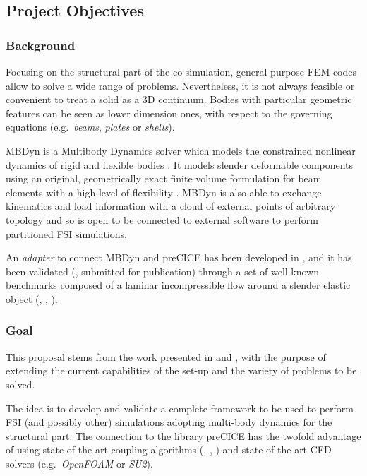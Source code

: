 \subsection*{Project Objectives}


\subsubsection*{Background}

Focusing on the structural part of the co-simulation, general purpose FEM codes allow to solve a wide range of problems. Nevertheless, it is not always feasible or convenient to treat a solid as a 3D continuum. Bodies with particular geometric features can be seen as lower dimension ones, with respect to the governing equations \cite{hjelmstad2007fundamentals} (e.g.\ \textit{beams}, \textit{plates} or \textit{shells}).

MBDyn is a Multibody Dynamics solver which models the constrained nonlinear dynamics of rigid and flexible bodies \cite{masarati2014efficient}. It models slender deformable components using an original, geometrically exact finite volume formulation for beam elements with a high level of flexibility \cite{ghiringhelli2000multibody,bauchau2016validation}. MBDyn is also able to exchange kinematics and load information with a cloud of external points of arbitrary topology \cite{quaranta2005conservative} and so is open to be connected to external software to perform partitioned FSI simulations.

An \textit{adapter} to connect MBDyn and preCICE has been developed in \cite{caccia2020master}, and it has been validated (\cite{caccia2021coupling}, submitted for publication) through a set of well-known benchmarks composed of a laminar incompressible flow around a slender elastic object (\cite{ramm1998fluid}, \cite{turek2006proposal}, \cite{turek2010numerical}).

\subsubsection*{Goal}

This proposal stems from the work presented in \cite{caccia2020master} and \cite{caccia2021coupling}, with the purpose of extending the current capabilities of the set-up and the variety of problems to be solved.

The idea is to develop and validate a complete framework to be used to perform FSI (and possibly other) simulations adopting multi-body dynamics for the structural part. The connection to the library preCICE has the twofold advantage of using state of the art coupling algorithms (\cite{mehl2016parallel}, \cite{bungartz2016precice}, \cite{degroote2009performance}) and state of the art CFD solvers \cite{uekermann2017official} (e.g.\ \textit{OpenFOAM} or \textit{SU2}).

